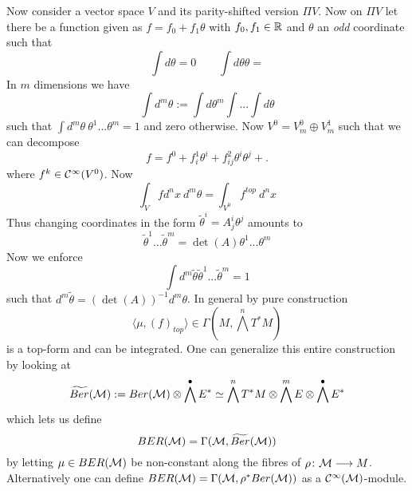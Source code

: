 \begin{rem}
  Now consider a vector space $V$ and its parity-shifted version $\Pi V$. Now on $\Pi V$ let there be a function given as $f = f_0 + f_1 \theta$ with $f_0, f_1 \in \mathbb{R}$ and $\theta$ an \emph{odd} coordinate such that
  \begin{equation}
    \int d\theta = 0 \quad  \quad \int d\theta \theta =
  \end{equation}
  In $m$ dimensions we have
  \begin{equation}
    \int d^m \theta := \int d\theta^m \int ... \int d\theta
  \end{equation}
  such that $\int d^m \theta \ \theta^1 ... \theta^m = 1$ and zero otherwise. Now $V^0 = V_m^0 \oplus V^1_m$ such that we can decompose
  \begin{equation}
    f = f^0 + f^1_i \theta^i + f^2_{ij} \theta^i \theta^j + .
  \end{equation}
  where $f^k \in \mathcal{C}^{\infty}(V^0)$. Now
  \begin{equation}
    \int_V f d^n x \ d^m \theta = \int_{V^0} f^{top} \ d^n x
  \end{equation}
  Thus changing coordinates in the form $\widetilde{\theta}^i = A^i_j \theta^j$ amounts to
  \begin{equation}
    \widetilde{\theta}^1 ... \widetilde{\theta}^m = \det(A) \theta^1 ... \theta^m
  \end{equation}
  Now we enforce
  \begin{equation}
    \int d^m \widetilde{\theta} \widetilde{\theta}^1 ... \widetilde{\theta}^m = 1
  \end{equation}
  such that $d^m \widetilde{\theta} = (\det(A))^{-1} d^m \theta$. In general by pure construction
  \begin{equation}
    \langle \mu, (f)_{top} \rangle \in \Gamma\left(M, \bigwedge^n T^* M \right)
  \end{equation}
  is a top-form and can be integrated. One can generalize this entire construction by looking at
  \begin{equation}
    \widetilde{Ber}(\mathcal{M}) := Ber(\mathcal{M}) \otimes \bigwedge^\bullet E^* \simeq \bigwedge^n T^*M \otimes \bigwedge^m E \otimes \bigwedge^\bullet E^*
  \end{equation}
  which lets us define
  \begin{equation}
    BER(\mathcal{M}) = \Gamma(\mathcal{M}, \widetilde{Ber}(\mathcal{M}))
  \end{equation}
  by letting $\mu \in BER(\mathcal{M})$ be non-constant along the fibres of $\rho \colon \mathcal{M} \longrightarrow M$. Alternatively one can define $BER(\mathcal{M})= \Gamma(\mathcal{M}, \rho^*Ber(\mathcal{M}))$ as a $\mathcal{C}^{\infty}(\mathcal{M})$-module.


\end{rem}

